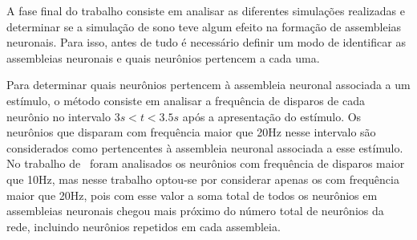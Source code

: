 A fase final do trabalho consiste em analisar as diferentes simulações realizadas e determinar se a simulação de sono teve algum
efeito na formação de assembleias neuronais. Para isso, antes de tudo é necessário definir um modo de identificar as assembleias
neuronais e quais neurônios pertencem a cada uma.

Para determinar quais neurônios pertencem à assembleia neuronal associada a um estímulo, o método consiste em analisar a
frequência de disparos de cada neurônio no intervalo $3s < t < 3.5s$ após a apresentação do estímulo. Os neurônios que disparam
com frequência maior que 20Hz nesse intervalo são considerados como pertencentes à assembleia neuronal associada a esse estímulo.
No trabalho de~ foram analisados os neurônios com frequência de disparos maior que 10Hz, mas nesse
trabalho optou-se por considerar apenas os com frequência maior que 20Hz, pois com esse valor a soma total de todos os neurônios
em assembleias neuronais chegou mais próximo do número total de neurônios da rede, incluindo neurônios repetidos em cada
assembleia.


